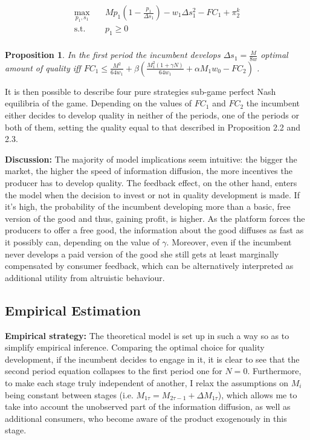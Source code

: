 \documentclass[13pt]{article}
\numberwithin{figure}{section}
\numberwithin{table}{section}
\theoremstyle{indented}
\newtheorem{proposition}{Proposition}[section]
\numberwithin{equation}{section} %
\begin{document}
$$
\begin{aligned}
\max_{p_1,s_1} \quad & Mp_1(1-\tfrac{p_1}{\Delta s_1}) - w_1 \Delta s_1^2 -FC_1 + \pi_2^{k}\\
\textrm{s.t.} \quad &p_1 \geq 0\\
\end{aligned}
$$


\begin{proposition}
In the first period the incumbent develops $\Delta s_1 = \tfrac{M}{8w}$ optimal amount of quality iff $FC_1 \leq \tfrac{M^2}{64w_1} + \beta(\tfrac{M_1^2(1+\gamma N)}{64w_1} + \alpha M_1w_0 - FC_2)$ .
\end{proposition} 

It is then possible to describe four pure strategies sub-game perfect Nash equilibria of the game. Depending on the values of $FC_1$ and $FC_2$ the incumbent either decides to develop quality in neither of the periods, one of the periods or both of them, setting the quality equal to that described in Proposition 2.2 and 2.3.

\textbf{Discussion:} The majority of model implications seem intuitive: the bigger the market, the higher the speed of information diffusion, the more incentives the producer has to develop quality. The feedback effect, on the other hand, enters the model when the decision to invest or not in quality development is made. If it's high, the probability of the incumbent developing more than a basic, free version of the good and thus, gaining profit, is higher. As the platform forces the producers to offer a free good, the information about the good diffuses as fast as it possibly can, depending on the value of $\gamma$. Moreover, even if the incumbent never develops a paid version of the good she still gets at least marginally compensated by consumer feedback, which can be alternatively interpreted as additional utility from altruistic behaviour.


\subsection{Empirical Estimation} \label{empirics}

\textbf{Empirical strategy:} The theoretical model is set up in such a way so as to simplify empirical inference. Comparing the optimal choice for quality development, if the incumbent decides to engage in it, it is clear to see that the second period equation collapses to the first period one for $N=0$. Furthermore, to make each stage truly independent of another, I relax the assumptions on $M_i$ being constant between stages (i.e. $M_{1\tau}=M_{2\tau-1}+\Delta M_{1\tau}$), which allows me to take into account the unobserved part of the information diffusion, as well as additional consumers, who become aware of the product exogenously in this stage.
\end{document}
